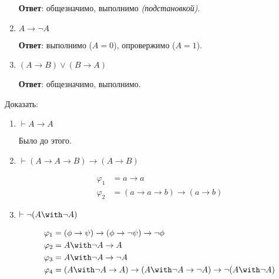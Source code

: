 \begin{exercise}
\begin{enumerate}
              \textbf{Ответ}: общезначимо, выполнимо \textit{(подстановкой)}.

        \item \(A \to \neg A\)

              \textbf{Ответ}: выполнимо (\(A = 0\)), опровержимо (\(A = 1\)).

        \item \((A \to B) \lor (B \to A)\)

              \textbf{Ответ}: общезначимо, выполнимо.
    \end{enumerate}

    Доказать:
    \begin{enumerate}
        \item \(\vdash A \to A\)

              Было до этого.

        \item \(\vdash (A \to A \to B) \to (A \to B)\)

              \begin{align*}
                  \varphi_1 & = a \to a                       \\
                  \varphi_2 & = (a \to a \to b) \to (a \to b)
              \end{align*}

        \item \(\vdash \neg (A \with \neg A)\)

              \begin{align*}
                  \varphi_1 & = (\phi \to \psi) \to (\phi \to \neg \psi) \to \neg \phi                           \\
                  \varphi_2 & = A \with \neg A \to A                                                             \\
                  \varphi_3 & = A \with \neg A \to \neg A                                                        \\
                  \varphi_4 & = (A \with \neg A \to A) \to (A \with \neg A \to \neg A) \to \neg (A \with \neg A) \\
              \end{align*}




\end{enumerate}
\end{exercise}
